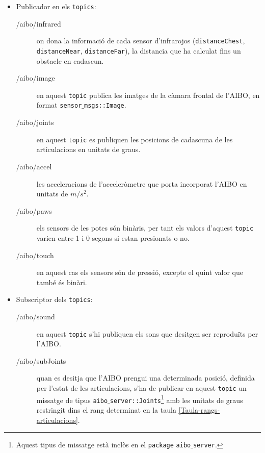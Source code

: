 \documentclass[12pt,a4paper,final,twoside]{article}
\begin{document}
\begin{itemize}

\item Publicador en els \texttt{topics}:
\begin{description}

\item[/aibo/infrared] on dona la informació de cada sensor d'infrarojos (\texttt{distanceChest}, \texttt{distanceNear}, \texttt{distanceFar}), la distancia que ha calculat fins un obstacle en cadascun.
\item[/aibo/image] en aquest \texttt{topic} publica les imatges de la càmara frontal de l'AIBO, en format \texttt{sensor$\_$msgs::Image}.
\item[/aibo/joints] en aquest \texttt{topic} es publiquen les posicions de cadascuna de les articulacions en unitats de graus.
\item[/aibo/accel] les acceleracions de l'acceleròmetre que porta incorporat l'AIBO en unitats de $m/s^2$.
\item[/aibo/paws] els sensors de les potes són binàris, per tant els valors d'aquest \texttt{topic} varien entre 1 i 0 segons si estan presionats o no.
\item[/aibo/touch] en aquest cas els sensors són de pressió, excepte el quint valor que també és binàri.


\end{description}

\item Subscriptor dels \texttt{topics}:

\begin{description}

\item[/aibo/sound] en aquest \texttt{topic} s'hi publiquen els sons que desitgen ser reproduïts per l'AIBO.
\item[/aibo/subJoints] quan es desitja que l'AIBO prengui una determinada posició, definida per l'estat de les articulacions, s'ha de publicar en aquest \texttt{topic} un missatge de tipus \texttt{aibo$\_$server::Joints}\footnote{Aquest tipus de missatge està inclòs en el \texttt{package} \texttt{aibo$\_$server}.} amb les unitats de graus restringit dins el rang determinat en la taula \ref{Taula-rangs-articulacions}.

\end{description}


\end{itemize}
\end{document}
